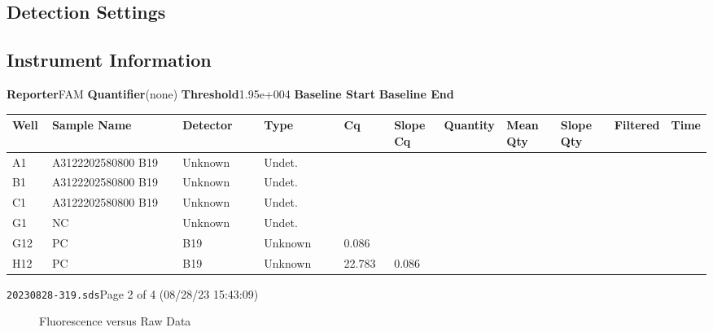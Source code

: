 \documentclass[UTF8,10pt,a4paper,fontset=fandol]{ctexart}
\begin{document}
\subsection{Detection Settings}

\subsection{Instrument Information}


\newpage

\begin{center}
\textbf{Reporter}\qquad FAM
\hfill
\textbf{Quantifier}\qquad (none)
\hfill
\textbf{Threshold}\qquad 1.95e+004
\hfill
\textbf{Baseline Start}
\hfill
\textbf{Baseline End}
\end{center}

\medskip

\small
\begin{tabular}{|p{0.06\linewidth}|p{0.23\linewidth}|p{0.14\linewidth}|p{0.14\linewidth}|p{0.08\linewidth}|p{0.08\linewidth}|p{0.09\linewidth}|p{0.09\linewidth}|p{0.09\linewidth}|p{0.08\linewidth}|p{0.08\linewidth}|}
\hline
\textbf{Well} &
\textbf{Sample Name} &
\textbf{Detector} &
\textbf{Type} &
\textbf{Cq} &
\textbf{Slope Cq} &
\textbf{Quantity} &
\textbf{Mean Qty} &
\textbf{Slope Qty} &
\textbf{Filtered} &
\textbf{Time}
\\ \hline
A1 & A3122202580800 B19 & Unknown & Undet. & & & & & & & \\
B1 & A3122202580800 B19 & Unknown & Undet. & & & & & & & \\
C1 & A3122202580800 B19 & Unknown & Undet. & & & & & & & \\
G1 & NC & Unknown & Undet. & & & & & & & \\
G12 & PC & B19 & Unknown & 0.086 & & & & & & \\
H12 & PC & B19 & Unknown & 22.783 & 0.086 & & & & & \\
\hline
\end{tabular}

\medskip

\noindent\texttt{20230828-319.sds}\hfill Page 2 of 4 (08/28/23 15:43:09)

\newpage

\begin{figure}[ht]
\centering
\caption{Fluorescence versus Raw Data}
\end{figure}
\end{document}

